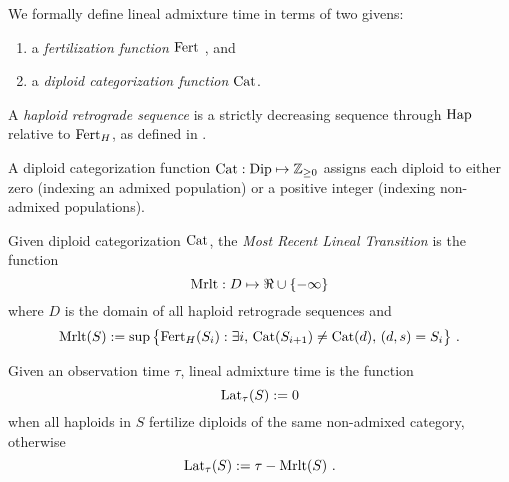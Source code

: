We formally define lineal admixture time in terms of two givens:
\begin{enumerate}
\item
  a \emph{fertilization function} $\mathrm{Fert}$ \cite{castedo_doc_153}, and
\item
  a \emph{diploid categorization function} $\mathrm{Cat}$.
\end{enumerate}

A \emph{haploid retrograde sequence} is a strictly decreasing sequence
through $\mathrm{Hap}$ relative to $\mathrm{Fert}_H$, as defined in \cite{castedo_doc_153}.

A diploid categorization function
$\mathrm{Cat}: \mathrm{Dip} \mapsto \mathbb{Z}_{\ge 0}$
assigns each diploid to either zero (indexing an admixed population)
or a positive integer (indexing non-admixed populations).

Given diploid categorization $\mathrm{Cat}$,
the \emph{Most Recent Lineal Transition} is the function
$$
\mathrm{Mrlt} : D \mapsto \Re \cup \{ -\infty \}
$$
where $D$ is the domain of all haploid retrograde sequences and
$$
\mathrm{Mrlt}(S) := \sup \big\{
    \mathrm{Fert}_H(S_i) : \exists i, \, \mathrm{Cat}(S_{i+1}) \not= \mathrm{Cat}(d), \, (d, s) = S_i 
\big\}
\text{ .}
$$

Given an observation time $\tau$, lineal admixture time is the function 
$$
\mathrm{Lat}_{\tau}(S) := 0
$$
when all haploids in $S$ fertilize diploids of the same non-admixed category, otherwise
$$
\mathrm{Lat}_{\tau}(S) := \tau - \mathrm{Mrlt}(S)
\text{ .}
$$


\printbibliography %

